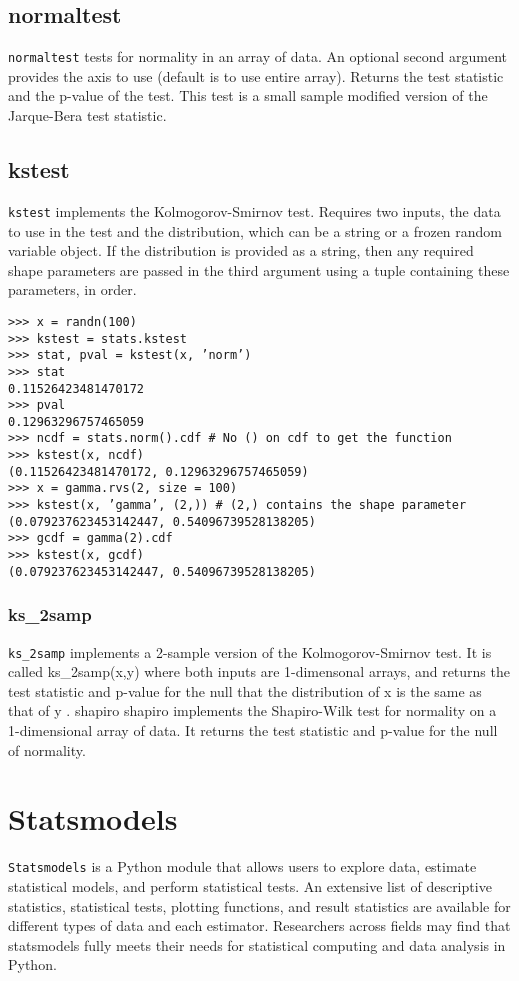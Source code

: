 \documentclass[KSmain.tex]{subfiles}
\begin{document}
\subsection{normaltest}
\texttt{normaltest} tests for normality in an array of data. An optional second argument provides the axis to use
(default is to use entire array). Returns the test statistic and the p-value of the test. This test is a small
sample modified version of the Jarque-Bera test statistic.
\subsection{kstest}
\texttt{kstest} implements the Kolmogorov-Smirnov test. Requires two inputs, the data to use in the test and the
distribution, which can be a string or a frozen random variable object. If the distribution is provided as
a string, then any required shape parameters are passed in the third argument using a tuple containing
these parameters, in order.
\begin{verbatim}
>>> x = randn(100)
>>> kstest = stats.kstest
>>> stat, pval = kstest(x, ’norm’)
>>> stat
0.11526423481470172
>>> pval
0.12963296757465059
>>> ncdf = stats.norm().cdf # No () on cdf to get the function
>>> kstest(x, ncdf)
(0.11526423481470172, 0.12963296757465059)
>>> x = gamma.rvs(2, size = 100)
>>> kstest(x, ’gamma’, (2,)) # (2,) contains the shape parameter
(0.079237623453142447, 0.54096739528138205)
>>> gcdf = gamma(2).cdf
>>> kstest(x, gcdf)
(0.079237623453142447, 0.54096739528138205)
\end{verbatim}

\subsubsection{ks\_2samp}
\texttt{ks\_2samp} implements a 2-sample version of the Kolmogorov-Smirnov test. It is called ks\_2samp(x,y)
where both inputs are 1-dimensonal arrays, and returns the test statistic and p-value for the null that
the distribution of x is the same as that of y .
shapiro
shapiro implements the Shapiro-Wilk test for normality on a 1-dimensional array of data. It returns the
test statistic and p-value for the null of normality.

\newpage
\section{Statsmodels}
\texttt{Statsmodels} is a Python module that allows users to explore data, estimate statistical models, and perform statistical tests. 
An extensive list of descriptive statistics, statistical tests, plotting functions, and result statistics are available for different types of 
data and each estimator. Researchers across fields may find that statsmodels fully meets their needs for statistical computing and data analysis 
in Python. 
\end{document}
